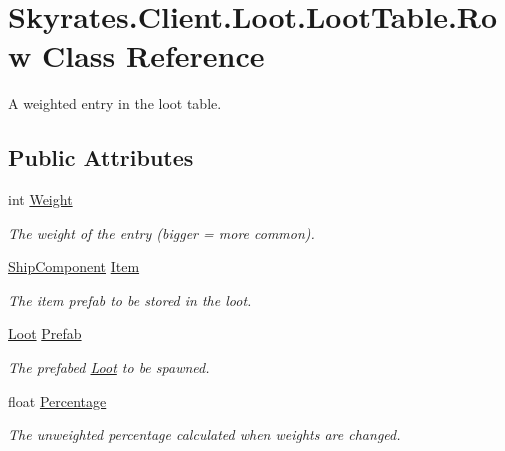 \hypertarget{class_skyrates_1_1_client_1_1_loot_1_1_loot_table_1_1_row}{\section{Skyrates.\-Client.\-Loot.\-Loot\-Table.\-Row Class Reference}
\label{class_skyrates_1_1_client_1_1_loot_1_1_loot_table_1_1_row}
}


A weighted entry in the loot table.  


\subsection*{Public Attributes}
\begin{DoxyCompactItemize}
\item 
int \hyperlink{class_skyrates_1_1_client_1_1_loot_1_1_loot_table_1_1_row_a37c7e8af6f77228bbc56ea49295d9c5d}{Weight}
\begin{DoxyCompactList}\small\item\em The weight of the entry (bigger = more common). \end{DoxyCompactList}\item 
\hyperlink{class_skyrates_1_1_client_1_1_ship_1_1_ship_component}{Ship\-Component} \hyperlink{class_skyrates_1_1_client_1_1_loot_1_1_loot_table_1_1_row_a029a405a7e04b52654cff5f0d4537ba8}{Item}
\begin{DoxyCompactList}\small\item\em The item prefab to be stored in the loot. \end{DoxyCompactList}\item 
\hyperlink{class_skyrates_1_1_client_1_1_loot_1_1_loot}{Loot} \hyperlink{class_skyrates_1_1_client_1_1_loot_1_1_loot_table_1_1_row_afd62822707961180e392415e5fd8cb53}{Prefab}
\begin{DoxyCompactList}\small\item\em The prefabed \hyperlink{class_skyrates_1_1_client_1_1_loot_1_1_loot}{Loot} to be spawned. \end{DoxyCompactList}\item 
float \hyperlink{class_skyrates_1_1_client_1_1_loot_1_1_loot_table_1_1_row_a94033188f91d43c16658659a93df21aa}{Percentage}
\begin{DoxyCompactList}\small\item\em The unweighted percentage calculated when weights are changed. \end{DoxyCompactList}\end{DoxyCompactItemize}


